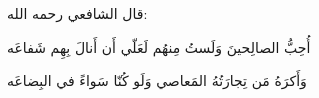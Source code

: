 
\chapter{}

قال الشافعي رحمه الله:
\begin{center}
    أُحِبُّ الصالِحينَ وَلَستُ مِنهُم  \qquad  لَعَلّي أَن أَنالَ بِهِم شَفاعَه

    وَأَكرَهُ مَن تِجارَتُهُ المَعاصي  \qquad   وَلَو كُنّا سَواءً في البِضاعَه
\end{center}